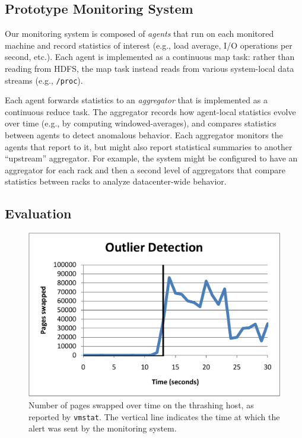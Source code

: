 \subsection{Prototype Monitoring System}
Our monitoring system is composed of \emph{agents} that run on each monitored
machine and record statistics of interest (e.g., load average, I/O operations
per second, etc.). Each agent is implemented as a continuous map task: rather
than reading from HDFS, the map task instead reads from various system-local
data streams (e.g., \texttt{/proc}).

Each agent forwards statistics to an \emph{aggregator} that is implemented as a
continuous reduce task. The aggregator records how agent-local statistics evolve
over time (e.g., by computing windowed-averages), and compares statistics
between agents to detect anomalous behavior. Each aggregator monitors the agents
that report to it, but might also report statistical summaries to another
``upstream'' aggregator. For example, the system might be configured to have an
aggregator for each rack and then a second level of aggregators that compare
statistics between racks to analyze datacenter-wide behavior.

\subsection{Evaluation}
\begin{figure}[t]
  \centering
  \includegraphics[width=0.95\linewidth]{eval/continue.pdf}
  \caption{Number of pages swapped over time on the thrashing host, as reported
    by \texttt{vmstat}.  The vertical line indicates the time at which the alert
    was sent by the monitoring system.}
\label{fig:outlier}
\end{figure}


